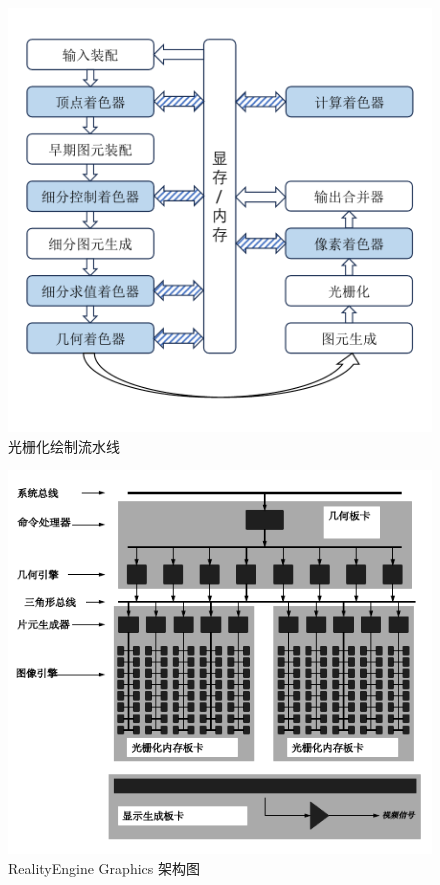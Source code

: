\begin{figure}
    \centering
    \includegraphics[page=1, width=0.7\linewidth]{figures/pictures.pdf}
    \caption{光栅化绘制流水线}
    \label{fig:rasterize_pipeline}
\end{figure}


\begin{figure}
    \centering
    \includegraphics[width=0.8\linewidth]{figures/RealityGraphics-Page2-Crop-Zh.pdf}
    \caption{RealityEngine Graphics 架构图\cite{RealityEngineSGI}}
    \label{fig:reality_engine_graphics}
\end{figure}

